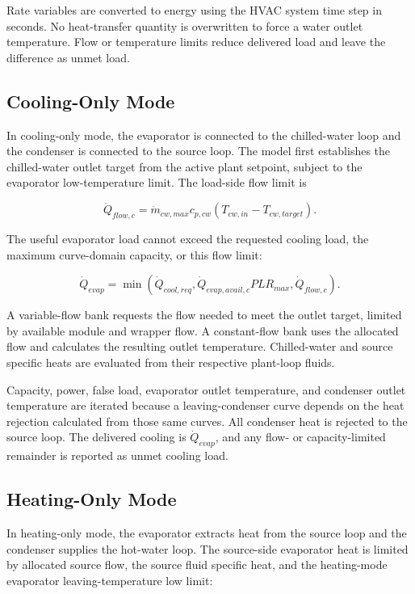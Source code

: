 Rate variables are converted to energy using the HVAC system time step in seconds. No heat-transfer quantity is overwritten to force a water outlet temperature. Flow or temperature limits reduce delivered load and leave the difference as unmet load.

\subsection{Cooling-Only Mode}
\label{cooling-only-mode}

In cooling-only mode, the evaporator is connected to the chilled-water loop and the condenser is connected to the source loop. The model first establishes the chilled-water outlet target from the active plant setpoint, subject to the evaporator low-temperature limit. The load-side flow limit is

\begin{equation}
\dot Q_{flow,c}=\dot m_{cw,max}c_{p,cw}\left(T_{cw,in}-T_{cw,target}\right).
\end{equation}

The useful evaporator load cannot exceed the requested cooling load, the maximum curve-domain capacity, or this flow limit:

\begin{equation}
\dot Q_{evap}=\min\left(\dot Q_{cool,req},\dot Q_{evap,avail,c}PLR_{max},\dot Q_{flow,c}\right).
\end{equation}

A variable-flow bank requests the flow needed to meet the outlet target, limited by available module and wrapper flow. A constant-flow bank uses the allocated flow and calculates the resulting outlet temperature. Chilled-water and source specific heats are evaluated from their respective plant-loop fluids.

Capacity, power, false load, evaporator outlet temperature, and condenser outlet temperature are iterated because a leaving-condenser curve depends on the heat rejection calculated from those same curves. All condenser heat is rejected to the source loop. The delivered cooling is \(\dot Q_{evap}\), and any flow- or capacity-limited remainder is reported as unmet cooling load.

\subsection{Heating-Only Mode}
\label{heating-only-mode}

In heating-only mode, the evaporator extracts heat from the source loop and the condenser supplies the hot-water loop. The source-side evaporator heat is limited by allocated source flow, the source fluid specific heat, and the heating-mode evaporator leaving-temperature low limit:

